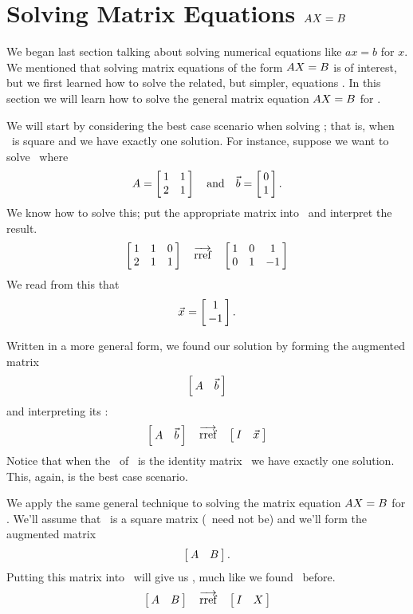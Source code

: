 \section{Solving Matrix Equations $\tta\ttx=\ttb$}\label{sec:solve_axb}


We began last section talking about solving numerical equations like $ax=b$ for $x$. We mentioned that solving matrix equations of the form $\tta\ttx=\ttb$ is of interest, but we first learned how to solve the related, but simpler, equations \ttaxb. In this section we will learn how to solve the general matrix equation $\tta\ttx=\ttb$ for \ttx.

We will start by considering the best case scenario when solving \ttaxb; that is, when \tta\ is square and we have exactly one solution. For instance, suppose we want to solve \ttaxb\ where $$\tta = \bmx{cc}1&1\\2&1\emx \quad \text{and} \quad \vb = \bmx{c} 0\\1\emx.$$ We know how to solve this; put the appropriate matrix into \rref\ and interpret the result. 
$$\bmx{ccc}1&1&0\\2&1&1\emx \quad \arref \quad \bmx{ccc}1&0&1\\0&1&-1\emx$$
We read from this that $$\vx = \bmx{c}1\\-1\emx.$$

Written in a more general form,  we found our solution by forming the augmented matrix $$\bmx{cc}\tta & \vb\emx$$ and interpreting its \rref: $$\bmx{cc}\tta & \vb\emx \quad \arref \quad \bmx{cc}\tti & \vx \emx$$ Notice that when the \rref\ of \tta\ is the identity matrix \tti\ we have exactly one solution. This, again, is the best case scenario.

We apply the same general technique to solving the matrix equation $\tta\ttx=\ttb$ for \ttx. We'll assume that \tta\ is a square matrix (\ttb\ need not be) and we'll form the augmented matrix $$\bmx{cc}\tta&\ttb\emx.$$ Putting this matrix into \rref\ will give us \ttx, much like we found \vx\ before.
$$\bmx{cc}\tta&\ttb\emx \quad \arref \quad \bmx{cc}\tti & \ttx\emx$$

